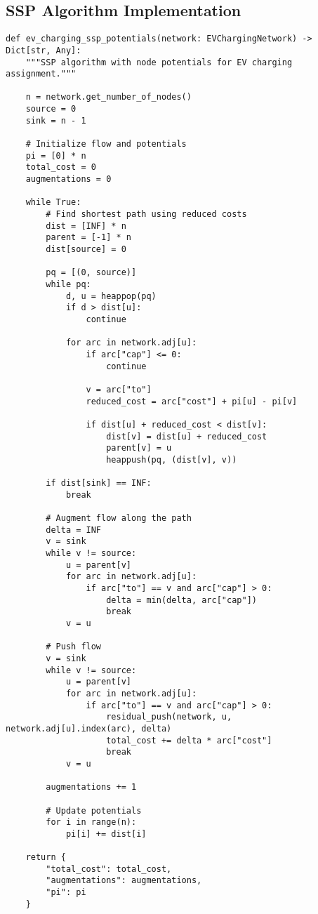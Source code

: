 \documentclass[12pt,a4paper]{article}
\begin{document}
\subsection{SSP Algorithm Implementation}

\begin{lstlisting}[caption=Successive Shortest Path with Potentials]
def ev_charging_ssp_potentials(network: EVChargingNetwork) -> Dict[str, Any]:
    """SSP algorithm with node potentials for EV charging assignment."""
    
    n = network.get_number_of_nodes()
    source = 0
    sink = n - 1
    
    # Initialize flow and potentials
    pi = [0] * n
    total_cost = 0
    augmentations = 0
    
    while True:
        # Find shortest path using reduced costs
        dist = [INF] * n
        parent = [-1] * n
        dist[source] = 0
        
        pq = [(0, source)]
        while pq:
            d, u = heappop(pq)
            if d > dist[u]:
                continue
                
            for arc in network.adj[u]:
                if arc["cap"] <= 0:
                    continue
                    
                v = arc["to"]
                reduced_cost = arc["cost"] + pi[u] - pi[v]
                
                if dist[u] + reduced_cost < dist[v]:
                    dist[v] = dist[u] + reduced_cost
                    parent[v] = u
                    heappush(pq, (dist[v], v))
        
        if dist[sink] == INF:
            break
            
        # Augment flow along the path
        delta = INF
        v = sink
        while v != source:
            u = parent[v]
            for arc in network.adj[u]:
                if arc["to"] == v and arc["cap"] > 0:
                    delta = min(delta, arc["cap"])
                    break
            v = u
            
        # Push flow
        v = sink
        while v != source:
            u = parent[v]
            for arc in network.adj[u]:
                if arc["to"] == v and arc["cap"] > 0:
                    residual_push(network, u, network.adj[u].index(arc), delta)
                    total_cost += delta * arc["cost"]
                    break
            v = u
            
        augmentations += 1
        
        # Update potentials
        for i in range(n):
            pi[i] += dist[i]
    
    return {
        "total_cost": total_cost,
        "augmentations": augmentations,
        "pi": pi
    }
\end{lstlisting}
\end{document}
